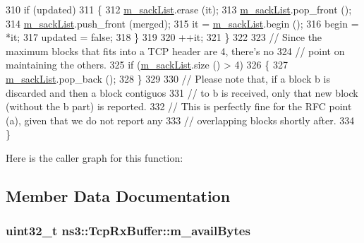 \begin{DoxyCode}
310       \textcolor{keywordflow}{if} (updated)
311         \{
312           \hyperlink{classns3_1_1TcpRxBuffer_aee4aac20f3e96f9108918d3650e58eb9}{m\_sackList}.erase (it);
313           \hyperlink{classns3_1_1TcpRxBuffer_aee4aac20f3e96f9108918d3650e58eb9}{m\_sackList}.pop\_front ();
314           \hyperlink{classns3_1_1TcpRxBuffer_aee4aac20f3e96f9108918d3650e58eb9}{m\_sackList}.push\_front (merged);
315           it = \hyperlink{classns3_1_1TcpRxBuffer_aee4aac20f3e96f9108918d3650e58eb9}{m\_sackList}.begin ();
316           begin = *it;
317           updated = \textcolor{keyword}{false};
318         \}
319 
320       ++it;
321     \}
322 
323   \textcolor{comment}{// Since the maximum blocks that fits into a TCP header are 4, there's no}
324   \textcolor{comment}{// point on maintaining the others.}
325   \textcolor{keywordflow}{if} (\hyperlink{classns3_1_1TcpRxBuffer_aee4aac20f3e96f9108918d3650e58eb9}{m\_sackList}.size () > 4)
326     \{
327       \hyperlink{classns3_1_1TcpRxBuffer_aee4aac20f3e96f9108918d3650e58eb9}{m\_sackList}.pop\_back ();
328     \}
329 
330   \textcolor{comment}{// Please note that, if a block b is discarded and then a block contiguos}
331   \textcolor{comment}{// to b is received, only that new block (without the b part) is reported.}
332   \textcolor{comment}{// This is perfectly fine for the RFC point (a), given that we do not report any}
333   \textcolor{comment}{// overlapping blocks shortly after.}
334 \}
\end{DoxyCode}


Here is the caller graph for this function\+:




\subsection{Member Data Documentation}
\subsubsection[{\texorpdfstring{m\+\_\+avail\+Bytes}{m_availBytes}}]{\setlength{\rightskip}{0pt plus 5cm}uint32\+\_\+t ns3\+::\+Tcp\+Rx\+Buffer\+::m\+\_\+avail\+Bytes\hspace{0.3cm}{\ttfamily [private]}}\hypertarget{classns3_1_1TcpRxBuffer_a700ba510c9ea3ef08f11baf0de7244dc}{}\label{classns3_1_1TcpRxBuffer_a700ba510c9ea3ef08f11baf0de7244dc}


